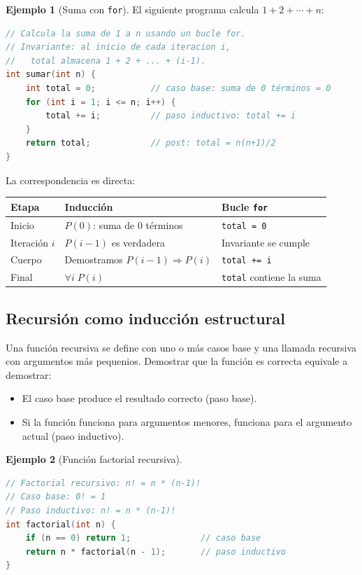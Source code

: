 \documentclass[11pt,a4paper]{article}
\theoremstyle{definition}
\theoremstyle{plain}
\theoremstyle{definition}
\newtheorem{ejemplo}{Ejemplo}[section]
\theoremstyle{definition}
\theoremstyle{remark}
\newcommand{\implica}{\Rightarrow}         %
\newcommand{\para}{\forall}               %
\begin{document}
\begin{ejemplo}[Suma con \texttt{for}]
\label{ej:for}
El siguiente programa calcula $1+2+\cdots+n$:

\begin{lstlisting}[language=C++]
// Calcula la suma de 1 a n usando un bucle for.
// Invariante: al inicio de cada iteracion i,
//   total almacena 1 + 2 + ... + (i-1).
int sumar(int n) {
    int total = 0;           // caso base: suma de 0 términos = 0
    for (int i = 1; i <= n; i++) {
        total += i;          // paso inductivo: total += i
    }
    return total;            // post: total = n(n+1)/2
}
\end{lstlisting}

La correspondencia es directa:
\begin{center}
\begin{tabular}{lll}
\toprule
\textbf{Etapa} & \textbf{Inducci\'on} & \textbf{Bucle \texttt{for}} \\
\midrule
Inicio & $P(0)$: suma de 0 t\'erminos & \texttt{total = 0} \\
Iteraci\'on $i$ & $P(i-1)$ es verdadera & Invariante se cumple \\
Cuerpo & Demostramos $P(i-1)\implica P(i)$ & \texttt{total += i} \\
Final & $\para i\; P(i)$ & \texttt{total} contiene la suma \\
\bottomrule
\end{tabular}
\end{center}
\end{ejemplo}

\subsection{Recursi\'on como inducci\'on estructural}

Una funci\'on recursiva se define con uno o m\'as casos base y una llamada
recursiva con argumentos m\'as pequenios. Demostrar que la funci\'on es correcta
equivale a demostrar:
\begin{itemize}
    \item El caso base produce el resultado correcto (paso base).
    \item Si la funci\'on funciona para argumentos menores, funciona para el
          argumento actual (paso inductivo).
\end{itemize}

\begin{ejemplo}[Funci\'on factorial recursiva]
\label{ej:recursiva2}

\begin{lstlisting}[language=C++]
// Factorial recursivo: n! = n * (n-1)!
// Caso base: 0! = 1
// Paso inductivo: n! = n * (n-1)!
int factorial(int n) {
    if (n == 0) return 1;              // caso base
    return n * factorial(n - 1);       // paso inductivo
}
\end{lstlisting}
\end{ejemplo}
\end{document}

